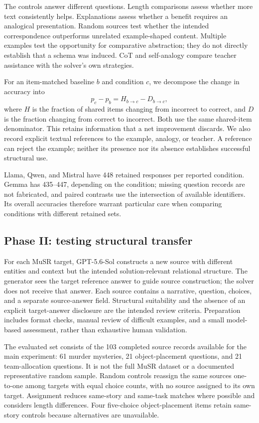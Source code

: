 The controls answer different questions. Length comparisons assess whether more text consistently helps. Explanations assess whether a benefit requires an analogical presentation. Random sources test whether the intended correspondence outperforms unrelated example-shaped content. Multiple examples test the opportunity for comparative abstraction; they do not directly establish that a schema was induced. CoT and self-analogy compare teacher assistance with the solver's own strategies.

For an item-matched baseline $b$ and condition $c$, we decompose the change in accuracy into
\begin{equation}
 p_c-p_b = H_{b\rightarrow c}-D_{b\rightarrow c},
 \label{eq:help-harm}
\end{equation}
where $H$ is the fraction of shared items changing from incorrect to correct, and $D$ is the fraction changing from correct to incorrect. Both use the same shared-item denominator. This retains information that a net improvement discards. We also record explicit textual references to the example, analogy, or teacher. A reference can reject the example; neither its presence nor its absence establishes successful structural use.

Llama, Qwen, and Mistral have 448 retained responses per reported condition. Gemma has 435--447, depending on the condition; missing question records are not fabricated, and paired contrasts use the intersection of available identifiers. Its overall accuracies therefore warrant particular care when comparing conditions with different retained sets.

\subsection{Phase II: testing structural transfer}
\label{sec:phase2method}
For each MuSR target, GPT-5.6-Sol constructs a new source with different entities and context but the intended solution-relevant relational structure. The generator sees the target reference answer to guide source construction; the solver does not receive that answer. Each source contains a narrative, question, choices, and a separate source-answer field. Structural suitability and the absence of an explicit target-answer disclosure are the intended review criteria. Preparation includes format checks, manual review of difficult examples, and a small model-based assessment, rather than exhaustive human validation.

The evaluated set consists of the 103 completed source records available for the main experiment: 61 murder mysteries, 21 object-placement questions, and 21 team-allocation questions. It is not the full MuSR dataset or a documented representative random sample. Random controls reassign the same sources one-to-one among targets with equal choice counts, with no source assigned to its own target. Assignment reduces same-story and same-task matches where possible and considers length differences. Four five-choice object-placement items retain same-story controls because alternatives are unavailable.

